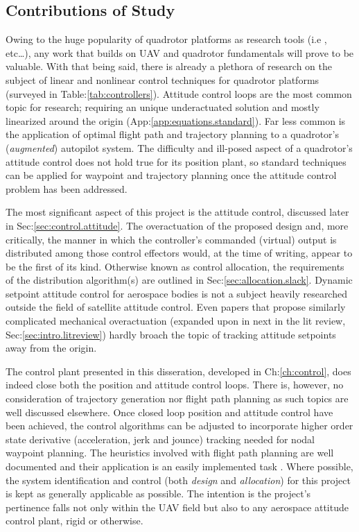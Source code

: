 \subsection{Contributions of Study}
\label{subsec:intro.foreword.significance}
Owing to the huge popularity of quadrotor platforms as research tools (i.e \cite{x4flyercontrol,intelligentbackstep,fullquadcoptercontrol}, etc\ldots), any work that builds on UAV and quadrotor fundamentals will prove to be valuable. With that being said, there is already a plethora of research on the subject of linear and nonlinear control techniques for quadrotor platforms (surveyed in Table:\ref{tab:controllers}). Attitude control loops are the most common topic for research; requiring an unique underactuated solution and mostly linearized around the origin (App:\ref{app:equations.standard}). Far less common is the application of optimal flight path and trajectory planning to a quadrotor's (\emph{augmented}) autopilot system. The difficulty and ill-posed aspect of a quadrotor's attitude control does not hold true for its position plant, so standard techniques can be applied for waypoint and trajectory planning once the attitude control problem has been addressed.
\par
The most significant aspect of this project is the attitude control, discussed later in Sec:\ref{sec:control.attitude}. The overactuation of the proposed design and, more critically, the manner in which the controller's commanded (virtual) output is distributed among those control effectors would, at the time of writing, appear to be the first of its kind. Otherwise known as control allocation, the requirements of the distribution algorithm(s) are outlined in Sec:\ref{sec:allocation.slack}. Dynamic setpoint attitude control for aerospace bodies is not a subject heavily researched outside the field of satellite attitude control. Even papers that propose similarly complicated mechanical overactuation (expanded upon in next in the lit review, Sec:\ref{sec:intro.litreview}) hardly broach the topic of tracking attitude setpoints away from the origin.
\par
The control plant presented in this disseration, developed in Ch:\ref{ch:control}, does indeed close both the position and attitude control loops. There is, however, no consideration of trajectory generation nor flight path planning as such topics are well discussed elsewhere. Once closed loop position and attitude control have been achieved, the control algorithms can be adjusted to incorporate higher order state derivative (acceleration, jerk and jounce) tracking needed for nodal waypoint planning. The heuristics involved with flight path planning are well documented and their application is an easily implemented task \cite{trajectorygeneration,planning,trajectorytracking}. Where possible, the system identification and control (both \emph{design} and \emph{allocation}) for this project is kept as generally applicable as possible. The intention is the project's pertinence falls not only within the UAV field but also to any aerospace attitude control plant, rigid or otherwise. 
